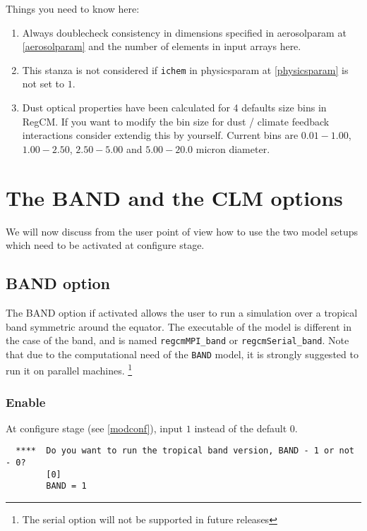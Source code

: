 Things you need to know here:

\begin{enumerate}
\item Always doublecheck consistency in dimensions specified in aerosolparam at
\ref{aerosolparam} and the number of elements in input arrays here.
\item This stanza is not considered if \verb=ichem= in physicsparam at
\ref{physicsparam} is not set to $1$.
\item Dust optical properties have been calculated for 4 defaults size bins
in RegCM. If you want to modify the bin size for dust / climate feedback
interactions consider extendig this by yourself. Current bins are $0.01-1.00$,
$1.00-2.50$, $2.50-5.00$ and $5.00-20.0$ micron diameter.
\end{enumerate}

\section{The BAND and the CLM options}

We will now discuss from the user point of view how to use the two model
setups which need to be activated at configure stage.

\subsection{BAND option}

The BAND option if activated allows the user to run a simulation over a tropical
band symmetric around the equator. The executable of the model is different
in the case of the band, and is named \verb=regcmMPI_band= or
\verb=regcmSerial_band=. Note that due to the computational need of the
\verb=BAND= model, it is strongly suggested to run it on parallel machines.
\footnote{The serial option will not be supported in future releases}

\subsubsection{Enable}

At configure stage (see \ref{modconf}), input $1$ instead of the default $0$.

\begin{Verbatim}
  ****  Do you want to run the tropical band version, BAND - 1 or not - 0?
        [0]
        BAND = 1
\end{Verbatim}

